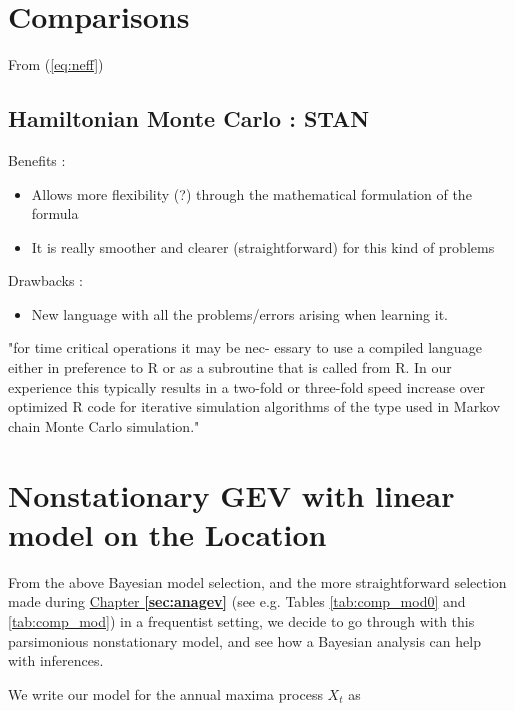  
 
 \section{Comparisons}
 
From (\ref{eq:neff})
 
 \subsection{Hamiltonian Monte Carlo : STAN}
 
 Benefits : 
 
 \begin{itemize}
 	\item Allows more flexibility (?) through the mathematical formulation of the formula
 	\item It is really smoother and clearer (straightforward) for this kind of problems 
 \end{itemize}
 
 Drawbacks : 
 
 \begin{itemize}
 	\item New language with all the problems/errors arising when learning it. 
 \end{itemize}
 
 
 
 "for time critical operations it may be nec-
 essary to use a compiled language either in preference to R or as a subroutine that
 is called from R. In our experience this typically results in a two-fold or three-fold
 speed increase over optimized R code for iterative simulation algorithms of the type
 used in Markov chain Monte Carlo simulation."
 
 

\section{Nonstationary GEV with linear model on the Location}\label{sec:bay_nonsta}


From the above Bayesian model selection, and the more straightforward selection made during \hyperref[sec:anagev]{Chapter \textbf{\ref{sec:anagev}}} (see e.g. Tables \ref{tab:comp_mod0} and \ref{tab:comp_mod}) in a frequentist setting, we decide to go through with this parsimonious nonstationary model, and see how a Bayesian analysis can help with inferences.

We write our model for the annual maxima process $X_t$ as  

